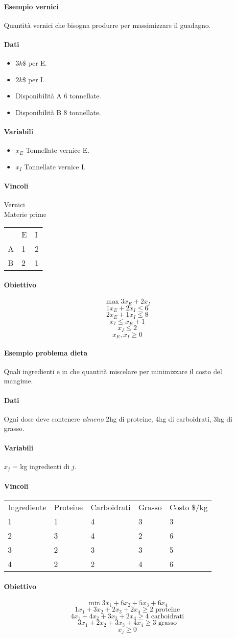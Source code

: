 \documentclass[12pt, letterpaper]{article}
\newcommand{\problema}[5]{
	#1
	\begin{dati}
		\paragraph{Dati} #2
	\end{dati}
	\begin{variabili}
		\paragraph{Variabili} #3
	\end{variabili}
	\begin{vincoli}
		\paragraph{Vincoli} #4
	\end{vincoli}
	\begin{obiettivo}
		\paragraph{Obiettivo} #5
	\end{obiettivo}
}
\begin{document}
			\paragraph{Esempio vernici}
				\problema
					{Quantità vernici che bisogna produrre per massimizzare il guadagno.
					}
					{\begin{itemize}
						\item $3k\$$ per E.
						\item $2k\$$ per I.
						\item Disponibilità A 6 tonnellate.
						\item Disponibilità B 8 tonnellate.
					\end{itemize}}
					{\begin{itemize}
						\item $x_E$ Tonnellate vernice E.
						\item $x_I$ Tonnellate vernice I.
					\end{itemize}}
					{\begin{center}
						\qquad\qquad\qquad\qquad Vernici\\
						Materie prime
						\begin{tabular}{lll}
								& E & I \\
							A 	& 1	& 2 \\
							B	& 2	& 1
						\end{tabular}
					\end{center}}
					{$$\max 3x_E + 2x_I$$
					$$1x_E + 2x_I \leq 6$$
					$$2x_E + 1x_I \leq 8$$
					$$x_I \leq x_E + 1$$
					$$x_I \leq 2$$
					$$x_E, x_I \geq 0 $$
					}
			\paragraph{Esempio problema dieta}
				\problema{Quali ingredienti e in che quantità miscelare per minimizzare il costo del mangime.}
					{Ogni dose deve contenere \textit{almeno} 2hg di proteine, 4hg di carboidrati, 3hg di grasso.}
					{$x_j$ = kg ingredienti di $j$.}
					{\begin{tabular}{lllll}
						
						Ingrediente & Proteine & Carboidrati & Grasso & Costo $\$$/kg\\
						1 & 1 & 4 & 3 & 3\\
						2 & 3 & 4 & 2 & 6\\
						3 & 2 & 3 & 3 & 5\\
						4 & 2 & 2 & 4 & 6\\
					\end{tabular}}
					{$$\min 3x_1 + 6x_2 + 5x_3 + 6x_4$$
					$$1x_1 + 3x_2 + 2x_3 + 2x_4 \geq 2 \text{ proteine}$$
					$$4x_1 + 4x_2 + 3x_3 + 2x_4 \geq 4 \text{ carboidrati}$$
					$$3x_1 + 2x_2 + 3x_3 + 4x_4 \geq 3 \text{ grasso}$$
					$$x_j \geq 0$$
					}
					
\end{document}
